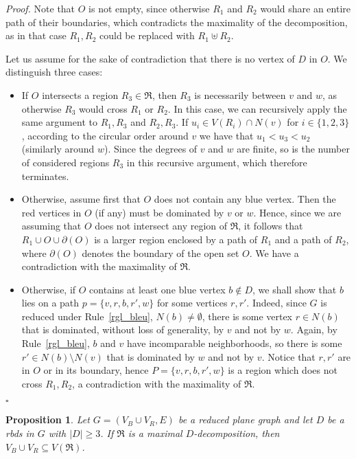 \documentclass[a4paper,11pt]{article}
\newtheorem{prop} {Proposition}
\newcommand{\rrgl}   [1] {Rule~\ref{#1}\xspace}
\newcommand{\drb}    [0] {rbds\xspace}
\newenvironment{proof}{\noindent \textit{Proof. }}{\hfill$\square$\vspace{.2cm}}
\begin{document}
\begin{proof}
 Note that $O$ is not empty, since otherwise $R_1$ and $R_2$ would share an entire path of their boundaries, which contradicts the maximality of the decomposition, as in that case $R_1, R_2$ could be replaced with $R_1 \uplus R_2$.

 Let us assume for the sake of contradiction that there is no vertex of $D$ in $O$. We distinguish three cases:
\begin{itemize}\itemsep0em


\item If $O$ intersects a region $R_3 \in \Re$, then $R_3$ is necessarily between $v$ and $w$, as otherwise $R_3$ would cross $R_1$ or $R_2$. In this case, we can recursively apply the same argument to $R_1,R_3$ and $R_2,R_3$. If $u_i \in V(R_i) \cap N(v)$ for $i \in\{1,2,3\}$, according to the circular order around $v$ we have that $u_1<u_3<u_2$  (similarly around $w$). Since the degrees of $v$ and $w$ are finite, so is the number of considered regions $R_3$ in this recursive argument, which therefore terminates.

\item Otherwise, assume first that $O$ does not contain any blue vertex.  Then the red vertices in $O$ (if any) must be dominated by $v$ or $w$. Hence, since we are assuming that  $O$ does not intersect any region  of $\Re$, it follows that $R_1 \cup O \cup \partial(O)$  is a larger region enclosed by a path of $R_1$ and a path of $R_2$, where $\partial(O)$ denotes the boundary of the open set $O$. We have a contradiction with the maximality of $\Re$.


\item Otherwise, if $O$ contains at least one blue vertex $b \notin D$, we shall show that $b$ lies on a path $p =\{v,r,b,r',w\}$ for some vertices $r,r'$. Indeed, since $G$ is reduced under \rrgl{rgl_bleu}, $N(b) \neq \emptyset$, there is some vertex $r \in N(b)$ that is dominated, without loss of generality, by $v$ and not by $w$. Again, by \rrgl{rgl_bleu}, $b$ and $v$ have incomparable neighborhoods, so there is some $r' \in N(b) \setminus N(v)$ that is dominated by $w$ and not by $v$. Notice that $r,r'$ are in $O$ or in its boundary, hence $P = \{v,r,b,r',w\}$ is a region which does not cross $R_1,R_2$, a contradiction with the maximality of $\Re$.


\end{itemize}\vspace{-.7cm}
\end{proof}

\begin{prop} \label{prop_nb_excl}
Let $G=(V_B \cup V_R,E)$ be a reduced plane graph and let $D$ be a \drb in $G$ with $|D| \geq 3$.
If $\Re$ is a maximal $D$-decomposition, then $V_B \cup V_R\subseteq V(\Re )$. \end{prop}
\end{document}
